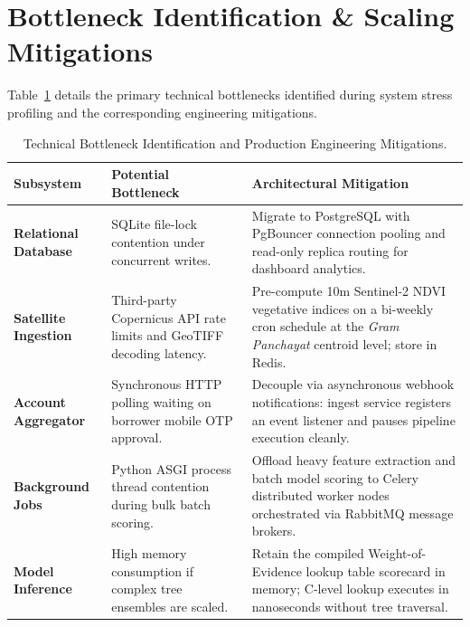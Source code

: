 \documentclass[11pt,a4paper,oneside]{report}
\begin{document}
\section{Bottleneck Identification \& Scaling Mitigations}
Table~\ref{tab:bottleneck_analysis} details the primary technical bottlenecks identified during system stress profiling and the corresponding engineering mitigations.

\begin{table}[H]
\centering
\small
\renewcommand{\arraystretch}{1.2}
\begin{tabularx}{\textwidth}{p{3.2cm} p{3.4cm} X}
  \toprule
  \textbf{Subsystem} & \textbf{Potential Bottleneck} & \textbf{Architectural Mitigation} \\
  \midrule
  \textbf{Relational Database} & SQLite file-lock contention under concurrent writes. & Migrate to PostgreSQL with PgBouncer connection pooling and read-only replica routing for dashboard analytics. \\
  \addlinespace
  \textbf{Satellite Ingestion} & Third-party Copernicus API rate limits and GeoTIFF decoding latency. & Pre-compute 10m Sentinel-2 NDVI vegetative indices on a bi-weekly cron schedule at the \textit{Gram Panchayat} centroid level; store in Redis. \\
  \addlinespace
  \textbf{Account Aggregator} & Synchronous HTTP polling waiting on borrower mobile OTP approval. & Decouple via asynchronous webhook notifications: ingest service registers an event listener and pauses pipeline execution cleanly. \\
  \addlinespace
  \textbf{Background Jobs} & Python ASGI process thread contention during bulk batch scoring. & Offload heavy feature extraction and batch model scoring to Celery distributed worker nodes orchestrated via RabbitMQ message brokers. \\
  \addlinespace
  \textbf{Model Inference} & High memory consumption if complex tree ensembles are scaled. & Retain the compiled Weight-of-Evidence lookup table scorecard in memory; C-level lookup executes in nanoseconds without tree traversal. \\
  \bottomrule
\end{tabularx}
\caption{Technical Bottleneck Identification and Production Engineering Mitigations.}
\label{tab:bottleneck_analysis}
\end{table}



\end{document}
